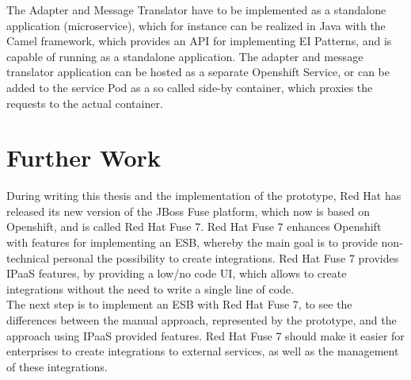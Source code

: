 The Adapter and Message Translator have to be implemented as a standalone application (microservice), which for instance can be realized in Java with the Camel framework, which provides an API for implementing EI Patterns, and is capable of running as a standalone application. The adapter and message translator application can be hosted as a separate Openshift Service, or can be added to the service Pod as a so called side-by container, which proxies the requests to the actual container.  \\

\section{Further Work}
\label{sec:esbd-furhter-work}
During writing this thesis and the implementation of the prototype, Red Hat has released its new version of the JBoss Fuse platform, which now is based on Openshift, and is called Red Hat Fuse 7. Red Hat Fuse 7 enhances Openshift with features for implementing an ESB, whereby the main goal is to provide non-technical personal the possibility to create integrations. Red Hat Fuse 7 provides IPaaS features, by providing a low/no code UI, which allows to create integrations without the need to write a single line of code. \\

The next step is to implement an ESB with Red Hat Fuse 7, to see the differences between the manual approach, represented by the prototype, and the approach using IPaaS provided features. Red Hat Fuse 7 should make it easier for enterprises to create integrations to external services, as well as the management of these integrations.   